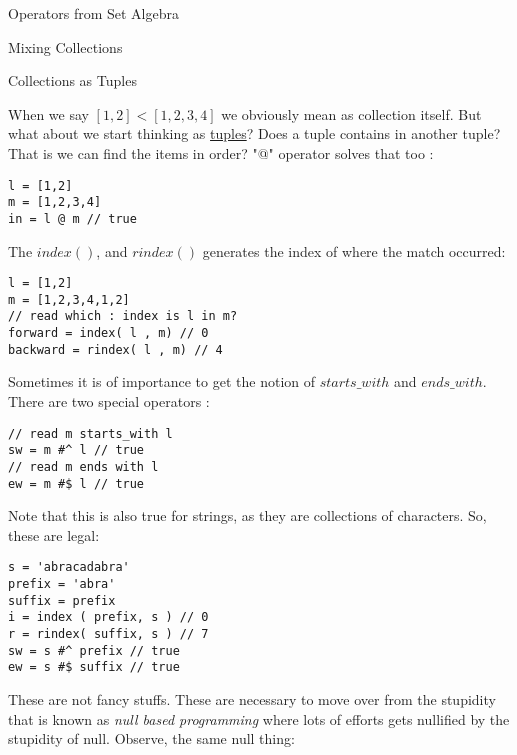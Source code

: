 \begin{section}{Operators from Set Algebra}
\begin{subsection}{Mixing Collections}
\end{subsection}


\begin{subsection}{Collections as Tuples}

When we say $[1,2] < [1,2,3,4] $ we obviously mean as collection itself.
But what about we start thinking as \href{https://en.wikipedia.org/wiki/Tuple}{tuples}?
Does a tuple contains in another tuple? That is we can find the items in order? 
"@" operator solves that too :

\begin{center}\begin{minipage}{\linewidth}
\begin{lstlisting}[style=JexlStyle]
l = [1,2]
m = [1,2,3,4]
in = l @ m // true 
\end{lstlisting}
\end{minipage}\end{center}

The $index()$, and $rindex()$ generates the index of where the match occurred:

\begin{lstlisting}[style=JexlStyle]
l = [1,2]
m = [1,2,3,4,1,2]
// read which : index is l in m?
forward = index( l , m) // 0 
backward = rindex( l , m) // 4   
\end{lstlisting}

Sometimes it is of importance to get the notion of $starts\_with$ and $ends\_with$.
There are two special operators :

\begin{lstlisting}[style=JexlStyle]
// read m starts_with l 
sw = m #^ l // true 
// read m ends with l 
ew = m #$ l // true 
\end{lstlisting}

Note that this is also true for strings, as they are collections of characters.
So, these are legal:

\begin{lstlisting}[style=JexlStyle]
s = 'abracadabra'
prefix = 'abra'
suffix = prefix
i = index ( prefix, s ) // 0 
r = rindex( suffix, s ) // 7 
sw = s #^ prefix // true 
ew = s #$ suffix // true 
\end{lstlisting}

These are not fancy stuffs. These are necessary to move over from the stupidity that is known 
as \emph{null based programming} where lots of efforts gets nullified by the stupidity of null.
Observe, the same null thing:


\end{subsection}
\end{section}

